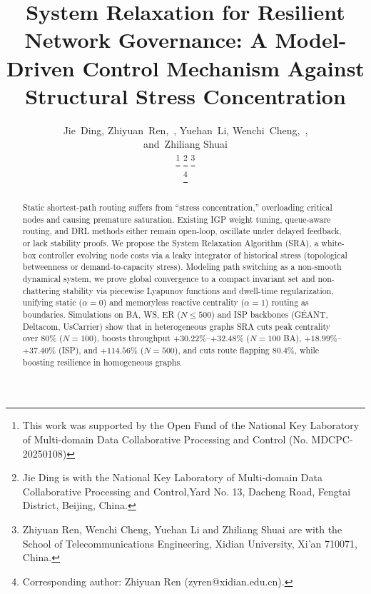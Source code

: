 \documentclass[journal]{IEEEtran}
\theoremstyle{plain}
\theoremstyle{definition}
\newcommand{\rev}[1]{{\color{blue}#1}}
\begin{document}
\title{System Relaxation for Resilient Network Governance: A Model-Driven Control Mechanism Against Structural Stress Concentration}


\author{Jie~Ding,
       Zhiyuan~Ren,~,  
       Yuehan~Li,
       Wenchi~Cheng,~,
       
       and~Zhiliang Shuai
        
\thanks{This work was supported by the Open Fund of the National Key Laboratory of Multi-domain Data Collaborative Processing and Control (No. MDCPC-20250108)}%
\thanks{Jie Ding is with the National Key Laboratory of Multi-domain Data Collaborative Processing and Control,Yard No. 13, Dacheng Road, Fengtai District, Beijing, China.}%
\thanks{Zhiyuan Ren, Wenchi Cheng, Yuehan Li and Zhiliang Shuai are with the School of Telecommunications Engineering, Xidian University, Xi'an 710071, China.}%

\thanks{Corresponding author: Zhiyuan Ren (zyren@xidian.edu.cn).}%
}

\maketitle


\begin{abstract}
Static shortest-path routing suffers from ``stress concentration,'' overloading critical nodes and causing premature saturation. \rev{Existing IGP weight tuning, queue-aware routing, and DRL methods either remain open-loop, oscillate under delayed feedback, or lack stability proofs.} We propose the System Relaxation Algorithm (SRA), a white-box controller evolving node costs via a leaky integrator of historical stress \rev{(topological betweenness or demand-to-capacity stress)}. Modeling path switching as a non-smooth dynamical system, we prove \rev{global convergence to a compact invariant set} and non-chattering stability via piecewise Lyapunov functions \rev{and dwell-time regularization}, unifying static \rev{($\alpha=0$) and memoryless reactive centrality ($\alpha=1$)} routing as boundaries. Simulations on \rev{BA, WS, ER ($N \le 500$) and ISP backbones (G\'EANT, Deltacom, UsCarrier)} show that in heterogeneous graphs SRA cuts peak centrality over $80\%$ \rev{($N=100$)}, boosts throughput \rev{$+30.22\%$--$+32.48\%$ ($N=100$ BA), $+18.99\%$--$+37.40\%$ (ISP), and $+114.56\%$ ($N=500$)}, and cuts route flapping \rev{$80.4\%$}, while boosting resilience in homogeneous graphs.
\end{abstract}
\end{document}
